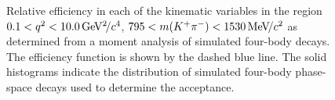 \begin{figure}[!tb]
  \caption{Relative efficiency in each of the kinematic variables in the region $0.1<{q^2}<10.0{\mathrm{\,Ge\kern -0.1em V^2\!/}c^4}$, $795<m({{K}^+}{{\pi}^-})<1530{\mathrm{\,Me\kern -0.1em V\!/}c^2}$ as determined from a moment analysis of simulated four-body \BdToKpimm decays. The efficiency function is shown by the dashed blue line.  The solid histograms indicate the distribution of simulated four-body \BdToKpimm phase-space decays used to determine the acceptance.}
\label{fig:acceptance}
\end{figure}
